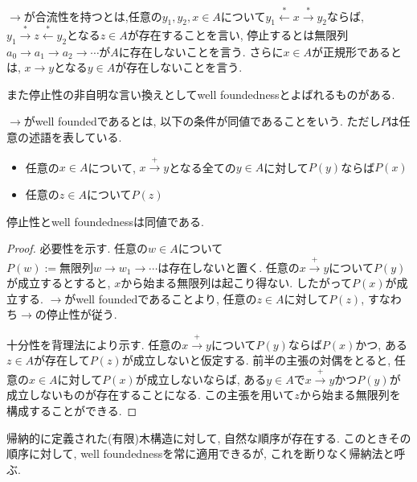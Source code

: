 \documentclass[12pt, titlepage]{ltjsarticle}
\begin{document}
\begin{defn}
$\rightarrow$が合流性を持つとは,任意の$y_{1},y_{2},x \in A$について$y_1 \overset{*}{\leftarrow} x \overset{*}{\rightarrow} y_2$ならば, $y_1 \overset{*}{\rightarrow} z \overset{*}{\leftarrow} y_2$となる$z \in A$が存在することを言い, 停止するとは無限列$a_0 \rightarrow a_1 \rightarrow a_2 \rightarrow \cdots$が$A$に存在しないことを言う. さらに$x \in A$が正規形であるとは, $x \rightarrow y$となる$y \in A$が存在しないことを言う.
\end{defn}

また停止性の非自明な言い換えとしてwell foundednessとよばれるものがある.

\begin{defn}
$\rightarrow$がwell foundedであるとは, 以下の条件が同値であることをいう. ただし$P$は任意の述語を表している.
 \begin{itemize}
  \item 任意の$x \in A$について, $x \xrightarrow{+} y$となる全ての$y \in A$に対して$P(y)$ならば$P(x)$
  \item 任意の$z \in A$について$P(z)$
 \end{itemize}
\end{defn}

\begin{thm}
 停止性とwell foundednessは同値である.
\end{thm}

\begin{proof}
 必要性を示す. 任意の$w \in A$について$P(w):= \text{無限列} w \rightarrow w_1 \rightarrow \cdots \text{は存在しない}$と置く. 任意の$x \xrightarrow{+} y$について$P(y)$が成立するとすると, $x$から始まる無限列は起こり得ない. したがって$P(x)$が成立する. $\rightarrow$がwell foundedであることより, 任意の$z \in A$に対して$P(z)$, すなわち$\rightarrow$の停止性が従う.
 
 十分性を背理法により示す. 任意の$x \xrightarrow{+} y$について$P(y)$ならば$P(x)$かつ, ある$z \in A$が存在して$P(z)$が成立しないと仮定する. 前半の主張の対偶をとると, 任意の$x \in A$に対して$P(x)$が成立しないならば, ある$y \in A$で$x \xrightarrow{+} y$かつ$P(y)$が成立しないものが存在することになる. この主張を用いて$z$から始まる無限列を構成することができる.
\end{proof}

\begin{rem}
帰納的に定義された(有限)木構造に対して, 自然な順序が存在する.
このときその順序に対して, well foundednessを常に適用できるが, これを断りなく帰納法と呼ぶ.
\end{rem}
\end{document}
